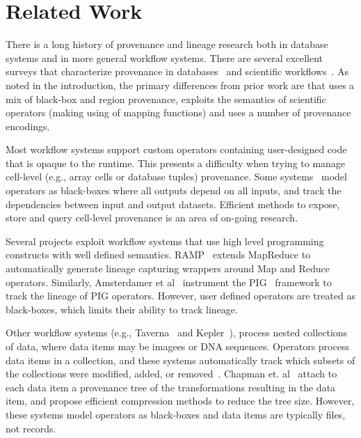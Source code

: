 \section{Related Work}




There is a long history of provenance and lineage research both in database
systems and in more general workflow systems.   There are several excellent
surveys that characterize provenance in databases~\cite{provdb} and scientific
workflows~\cite{provsci,provsci2}.  As noted in the introduction, the primary
differences from prior work  are that \sys{} uses a mix of black-box and region
provenance, exploits the semantics of scientific operators (making using of
mapping functions) and uses a number of provenance encodings.  

Most workflow systems support custom operators containing user-designed code
that is opaque to the runtime.  This presents a difficulty when trying to
manage cell-level (e.g., array cells or database tuples) provenance.  Some
systems~\cite{genepattern,galaxy} model operators as black-boxes where all
outputs depend on all inputs, and track the dependencies between input and
output datasets.  Efficient methods to expose, store and query cell-level
provenance is an area of on-going research.

Several projects exploit workflow systems that use high level programming
constructs with well defined semantics.  RAMP~\cite{ramp} extends MapReduce to
automatically generate lineage capturing wrappers around Map and Reduce
operators.  Similarly, Amsterdamer et al~\cite{lipstick} instrument the
PIG~\cite{pig} framework to track the lineage of PIG operators.  However,
 user defined operators are treated as black-boxes, which limits their ability to
track lineage. 

Other workflow systems (e.g., Taverna~\cite{taverna} and Kepler~\cite{kepler}),
process nested collections of data, where  data items may be  imagees or DNA
sequences.  Operators  process  data items in a collection, and these systems
automatically track which subsets of  the collections were modified, added, or
removed~\cite{keplerfine,tavernafine}.  Chapman et. al~\cite{chapman} attach
to each data item a provenance tree of the transformations resulting in the
data item, and propose efficient compression methods to reduce the tree size.
However, these systems  model  operators as black-boxes and data items
are typically files, not records.

